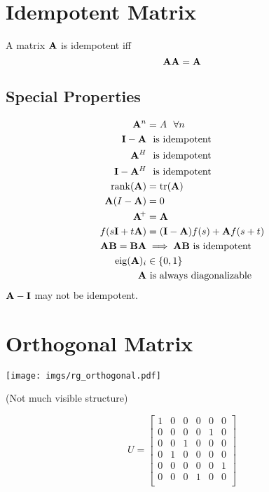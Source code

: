 \section{Idempotent Matrix}
A matrix $\mathbf{A}$ is idempotent iff
\begin{equation}
\mathbf{A}\mathbf{A}=\mathbf{A}
\end{equation}

\subsection*{Special Properties}
\begin{align}
\mathbf{A}^n        &=A~~\forall n              \\
\mathbf{I}-\mathbf{A}      &~~\textrm{is idempotent}   \\
\mathbf{A}^H        &~~\textrm{is idempotent}   \\
\mathbf{I}-\mathbf{A}^H    &~~\textrm{is idempotent}   \\
\operatorname{rank}(\mathbf{A})   &= \operatorname{tr}(\mathbf{A})              \\
\mathbf{A}(I-\mathbf{A})   &= 0                        \\
\mathbf{A}\!^+     &= \mathbf{A}                      \\
f(s\mathbf{I}+t\mathbf{A}) &= (\mathbf{I}-\mathbf{A})f(s)+\mathbf{A} f(s+t) \\
\mathbf{A}\mathbf{B}=\mathbf{B}\mathbf{A}&\implies \mathbf{A}\mathbf{B}~\textrm{is idempotent} \\
\operatorname{eig}(\mathbf{A})_i  &\in \{0,1\} \\
\mathbf{A} & \textrm{~is always diagonalizable}
\end{align}
$\mathbf{A}-\mathbf{I}$ may not be idempotent.




\section{Orthogonal Matrix}

\begin{center}
\texttt{[image: imgs/rg\_orthogonal.pdf]}

(Not much visible structure)
\end{center}


\begin{equation}
U=
\begin{bmatrix}
1 & 0 & 0 & 0 & 0 & 0 \\
0 & 0 & 0 & 0 & 1 & 0 \\
0 & 0 & 1 & 0 & 0 & 0 \\
0 & 1 & 0 & 0 & 0 & 0 \\
0 & 0 & 0 & 0 & 0 & 1 \\
0 & 0 & 0 & 1 & 0 & 0 \\
\end{bmatrix}
\end{equation}

